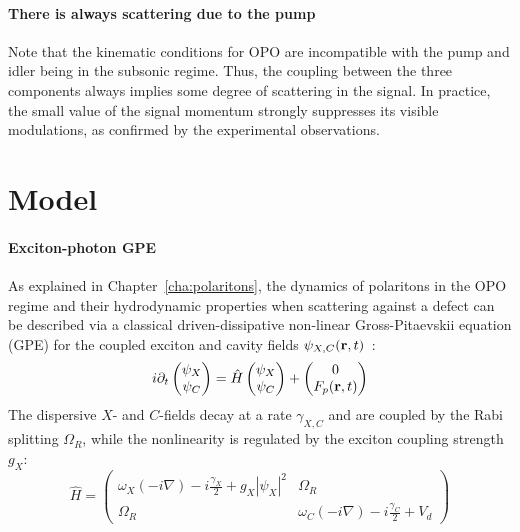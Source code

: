 \paragraph{There is always scattering due to the pump}
Note that the kinematic conditions for OPO are incompatible with the
pump and idler being in the subsonic regime. Thus, the coupling
between the three components always implies some degree of scattering
in the signal. In practice, the small value of the signal momentum
strongly suppresses its visible modulations, as confirmed by the
experimental observations.

\section{Model}
\label{sec:model-opo}

\paragraph{Exciton-photon GPE}
As explained in Chapter~\ref{cha:polaritons}, the dynamics of
polaritons in the OPO regime and their hydrodynamic properties when
scattering against a defect can be described via a classical
driven-dissipative non-linear Gross-Pitaevskii equation (GPE) for the
coupled exciton and cavity fields
$\psi_{X,C} (\mathbf{r},t)$~\cite{Whittaker_2005,Carusotto_2013}:
%
\begin{equation}
  i\partial_t \begin{pmatrix} \psi_X \\ \psi_C \end{pmatrix} =
  \hat{H} \begin{pmatrix} \psi_X \\ \psi_C \end{pmatrix}
  + \begin{pmatrix} 0 \\ F_p(\mathbf{r},t) \end{pmatrix}
\label{eq:gpequ}
\end{equation}
%
The dispersive $X$- and $C$-fields decay at a rate $\gamma_{X,C}$ and
are coupled by the Rabi splitting $\Omega_R$, while the nonlinearity
is regulated by the exciton coupling strength $g_X$:
%
\begin{equation}
  \hat{H} = \begin{pmatrix} \omega_{X}(-i\nabla) - i
    \frac{\gamma_X}{2} + g_X |\psi_X|^2 & \Omega_R \\ \Omega_R &
    \omega_C(-i\nabla) - i \frac{\gamma_C}{2} + V_d \end{pmatrix}
\end{equation}
